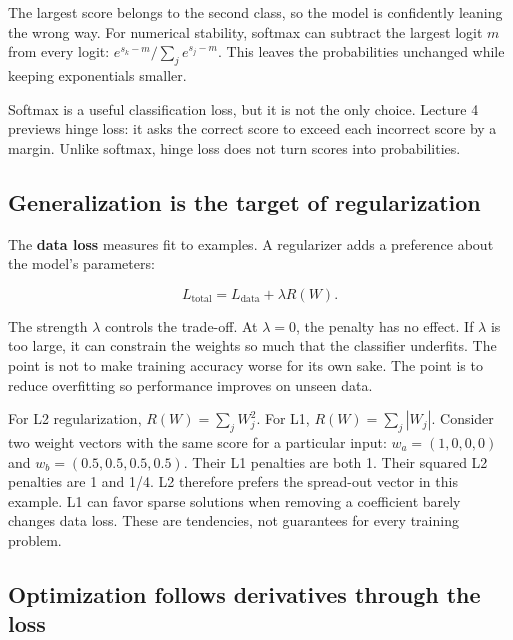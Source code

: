 The largest score belongs to the second class, so the model is confidently leaning the wrong way. For numerical stability, softmax can subtract the largest logit \(m\) from every logit: \(e^{s_k-m}/\sum_j e^{s_j-m}\). This leaves the probabilities unchanged while keeping exponentials smaller.

Softmax is a useful classification loss, but it is not the only choice. Lecture 4 previews hinge loss: it asks the correct score to exceed each incorrect score by a margin. Unlike softmax, hinge loss does not turn scores into probabilities.

\subsection{Generalization is the target of regularization}\label{04-visual-computing-ii-ch031-generalization-is-the-target-of-regularization}

\hypertarget{04-visual-computing-ii-ch031-generalization-is-the-target-of-regularization}{}

The \textbf{data loss} measures fit to examples. A regularizer adds a preference about the model's parameters:

\[L_{\text{total}}=L_{\text{data}}+\lambda R(W).\]

The strength \(\lambda\) controls the trade-off. At \(\lambda=0\), the penalty has no effect. If \(\lambda\) is too large, it can constrain the weights so much that the classifier underfits. The point is not to make training accuracy worse for its own sake. The point is to reduce overfitting so performance improves on unseen data.

For L2 regularization, \(R(W)=\sum_j W_j^2\). For L1, \(R(W)=\sum_j|W_j|\). Consider two weight vectors with the same score for a particular input: \(w_a=(1,0,0,0)\) and \(w_b=(0.5,0.5,0.5,0.5)\). Their L1 penalties are both 1. Their squared L2 penalties are 1 and 1/4. L2 therefore prefers the spread-out vector in this example. L1 can favor sparse solutions when removing a coefficient barely changes data loss. These are tendencies, not guarantees for every training problem.

\subsection{Optimization follows derivatives through the loss}\label{04-visual-computing-ii-ch031-optimization-follows-derivatives-through-the-loss}

\hypertarget{04-visual-computing-ii-ch031-optimization-follows-derivatives-through-the-loss}{}

